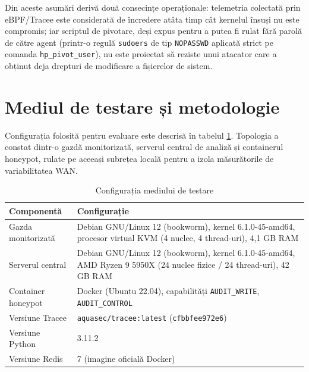 Din aceste asumări derivă două consecințe operaționale: telemetria colectată
prin eBPF/Tracee este considerată de încredere atâta timp cât kernelul
însuși nu este compromis; iar scriptul de pivotare, deși expus pentru a
putea fi rulat fără parolă de către agent (printr-o regulă \texttt{sudoers}
de tip \texttt{NOPASSWD} aplicată strict pe comanda \texttt{hp\_pivot\_user}),
nu este proiectat să reziste unui atacator care a obținut deja drepturi
de modificare a fișierelor de sistem.

\section{Mediul de testare și metodologie}

Configurația folosită pentru evaluare este descrisă în tabelul
\ref{tab:cap6-env}. Topologia a constat dintr-o gazdă monitorizată, serverul
central de analiză și containerul honeypot, rulate pe aceeași subrețea
locală pentru a izola măsurătorile de variabilitatea WAN.

\begin{table}[h]
  \centering
  \caption{Configurația mediului de testare}
  \label{tab:cap6-env}
  \renewcommand{\arraystretch}{1.08}
  \begin{tabular}{|l|p{}|}
    \hline
    \textbf{Componentă} & \textbf{Configurație} \\
    \hline\hline
    Gazda monitorizată       & Debian GNU/Linux 12 (bookworm), kernel 6.1.0-45-amd64, procesor virtual KVM (4 nuclee, 4 thread-uri), 4{,}1 GB RAM \\
    \hline
    Serverul central         & Debian GNU/Linux 12 (bookworm), kernel 6.1.0-45-amd64, AMD Ryzen 9 5950X (24 nuclee fizice / 24 thread-uri), 42 GB RAM \\
    \hline
    Container honeypot       & Docker (Ubuntu 22.04), capabilități \texttt{AUDIT\_WRITE}, \texttt{AUDIT\_CONTROL} \\
    \hline
    Versiune Tracee          & \texttt{aquasec/tracee:latest} (\texttt{cfbbfee972e6}) \\
    \hline
    Versiune Python          & 3.11.2                                        \\
    \hline
    Versiune Redis           & 7 (imagine oficială Docker)                   \\
    \hline
  \end{tabular}
\end{table}

